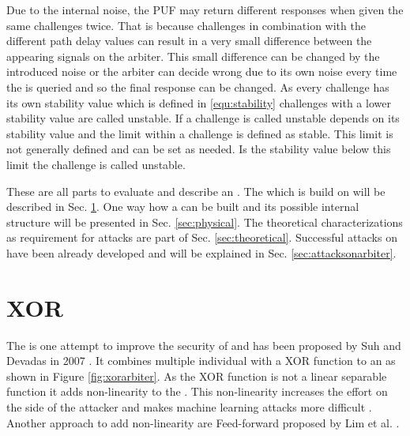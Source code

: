 Due to the internal noise, the PUF may return different responses when given the same challenges twice.
That is because challenges in combination with the different path delay values can result in a very small difference between the appearing signals on the arbiter.
This small difference can be changed by the introduced noise or the arbiter can decide wrong due to its own noise every time the \apuf is queried and so the final response can be changed.
As every challenge has its own stability value which is defined in \ref{equ:stability} challenges with a lower stability value are called unstable.
If a challenge is called unstable depends on its stability value and the limit within a challenge is defined as stable.
This limit is not generally defined and can be set as needed.
Is the stability value below this limit the challenge is called unstable.

These are all parts to evaluate and describe an \apuf.
The \xpuf which is build on \apufs will be described in Sec. \ref{sec:xorarbiterpufs}.
One way how a \apuf can be built and its possible internal structure will be presented in Sec. \ref{sec:physical}.
The theoretical characterizations as requirement for attacks are part of Sec. \ref{sec:theoretical}.
Successful attacks on \apufs have been already developed and will be explained in Sec. \ref{sec:attacksonarbiter}.


\section{\acs{XOR} \apufs}
\label{sec:xorarbiterpufs}

The \xpuf is one attempt to improve the security of \apufs and has been proposed by Suh and Devadas in 2007 \cite{Suh2007PhysicalGeneration}.
It combines multiple individual \apufs with a \acf{XOR} function to an \xpuf as shown in Figure \ref{fig:xorarbiter}.
As the \ac{XOR} function is not a linear separable function it adds non-linearity to the \puf. 
This non-linearity increases the effort on the side of the attacker and makes machine learning attacks more difficult \cite{Greibach2010OnBifurcation, Lim2005ExtractingCircuits}.
Another approach to add non-linearity are Feed-forward \apufs proposed by Lim et al. \cite{Lim2005ExtractingCircuits}.

